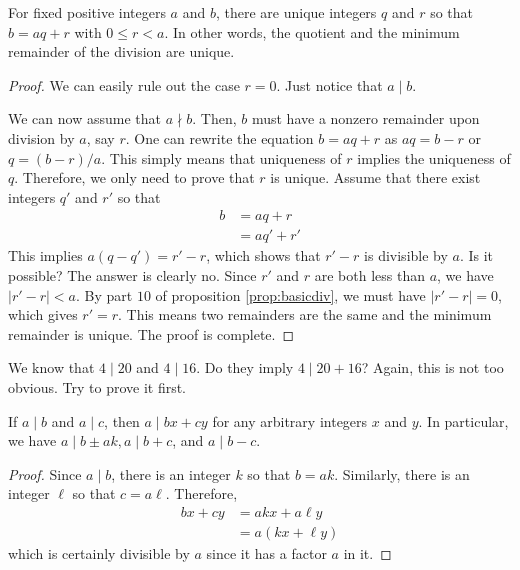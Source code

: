 \begin{proposition}
	For fixed positive integers $a$ and $b$, there are unique integers $q$ and $r$ so that $b=aq+r$ with $0\leq r<a$. In other words, the quotient and the minimum remainder of the division are unique.
\end{proposition}

\begin{proof}
	We can easily rule out the case $r=0$. Just notice that $a\mid b$.

	We can now assume that $a\nmid b$. Then, $b$ must have a nonzero remainder upon division by $a$, say $r$. One can rewrite the equation $b=aq+r$ as $aq=b-r$ or $q=(b-r)/a$. This simply means that uniqueness of $r$ implies the uniqueness of $q$. Therefore, we only need to prove that $r$ is unique. Assume that there exist integers $q'$ and $r'$ so that
	\begin{align*}
		b
			& =aq+r\\
			& =aq'+r'
	\end{align*}
	This implies $a(q-q')=r'-r$, which shows that $r'-r$ is divisible by $a$. Is it possible? The answer is clearly no. Since $r'$ and $r$ are both less than $a$, we have $|r'-r|<a$. By part $10$ of proposition \eqref{prop:basicdiv}, we must have $|r'-r|=0$, which gives $r'=r$. This means two remainders are the same and the minimum remainder is unique. The proof is complete.
\end{proof}


\begin{question}
	We know that $4\mid 20$ and $4\mid 16$. Do they imply $4\mid 20+16$? Again, this is not too obvious. Try to prove it first.
\end{question}

\begin{proposition}\label{prop:a|bx+cy}
	If $a\mid b$ and $a\mid c$, then $a\mid bx+cy$ for any arbitrary integers $x$ and $y$. In particular, we have $a\mid b\pm ak,a\mid b+c$, and $a\mid b-c$.
\end{proposition}

\begin{proof}
	Since $a\mid b$, there is an integer $k$ so that $b=ak$. Similarly, there is an integer $\ell$ so that $c=a\ell$. Therefore,
	\begin{align*}
		bx+cy
			& =akx+a\ell y\\
			& =a(kx+\ell y)
	\end{align*}
	which is certainly divisible by $a$ since it has a factor $a$ in it.
\end{proof}

